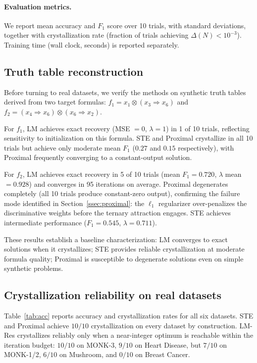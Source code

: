 \documentclass[10pt,a4paper,twoside]{article}
\newcommand{\tnorm}{\otimes}      %
\newcommand{\resid}{\Rightarrow}  %
\begin{document}
\paragraph{Evaluation metrics.}
We report mean accuracy and $F_1$ score over 10 trials, with standard
deviations, together with crystallization rate (fraction of trials achieving
$\Delta(N) < 10^{-3}$).
Training time (wall clock, seconds) is reported separately.

\subsection{Truth table reconstruction}
\label{ssec:tt}

Before turning to real datasets, we verify the methods on synthetic truth
tables derived from two target formulas:
$f_1 = x_1 \tnorm (x_3 \resid x_6)$ and
$f_2 = (x_4 \resid x_6) \tnorm (x_6 \resid x_2)$.

For $f_1$, LM achieves exact recovery (MSE $= 0$, $\lambda = 1$) in 1 of 10 trials,
reflecting sensitivity to initialization on this formula.
STE and Proximal crystallize in all 10 trials but achieve only moderate mean
$F_1$ ($0.27$ and $0.15$ respectively), with Proximal frequently converging
to a constant-output solution.

For $f_2$, LM achieves exact recovery in 5 of 10 trials
(mean $F_1 = 0.720$, $\lambda$ mean $= 0.928$) and converges in 95 iterations
on average.
Proximal degenerates completely (all 10 trials produce constant-zero output),
confirming the failure mode identified in Section~\ref{ssec:proximal}:
the $\ell_1$ regularizer over-penalizes the discriminative weights before
the ternary attraction engages.
STE achieves intermediate performance ($F_1 = 0.545$, $\lambda = 0.711$).

These results establish a baseline characterization: LM converges to exact
solutions when it crystallizes; STE provides reliable crystallization at
moderate formula quality; Proximal is susceptible to degenerate solutions even
on simple synthetic problems.

\subsection{Crystallization reliability on real datasets}
\label{ssec:cryst_real}

Table~\ref{tab:acc} reports accuracy and crystallization rates for all six
datasets.
STE and Proximal achieve $10/10$ crystallization on every dataset by
construction.
LM-Res crystallizes reliably only when a near-integer optimum is reachable
within the iteration budget: $10/10$ on MONK-3, $9/10$ on Heart Disease,
but $7/10$ on MONK-1/2, $6/10$ on Mushroom, and $0/10$ on Breast Cancer.
\end{document}
